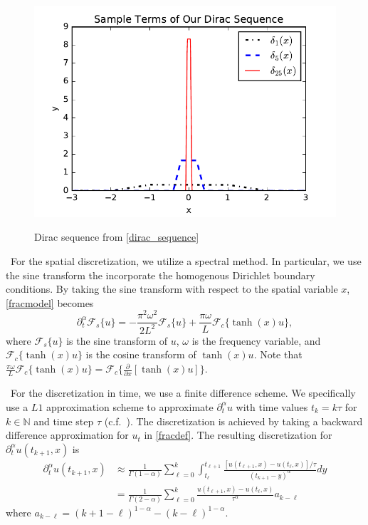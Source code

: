 \documentclass{siamart1116}
\newcommand{\LB}[1]{{\color{blue}~\textsf{#1}}}
\begin{document}
\begin{figure}[h!]
\begin{center}\label{dirac_sequence_fig}
\includegraphics[width=.5\textwidth]{delta_sequence}
\caption{Dirac sequence from \eqref{dirac_sequence}}
\end{center}
\end{figure}


\LB{For the spatial discretization, we utilize a spectral method. In particular, we use the sine transform the incorporate the homogenous Dirichlet boundary conditions. By taking the sine transform} with respect to the spatial variable $x$, \eqref{fracmodel} becomes
\begin{equation}
\partial^{\alpha}_{t}\mathcal{F}_s\{u\}=-\frac{\pi^2\omega^2}{2L^2}\mathcal{F}_s\{u\}+\frac{\pi\omega}{L}\mathcal{F}_c\{\tanh(x)u\},\label{sineq}
\end{equation}
where $\mathcal{F}_s\{u\}$ is the sine transform of $u$, $\omega$ is the frequency variable, and \LB{$\mathcal{F}_c\{\tanh(x)u\}$ is the cosine transform of $\tanh(x)u$. Note that $\frac{\pi\omega}{L}\mathcal{F}_c\{\tanh(x)u\} = \mathcal{F}_c\{\frac{\partial}{\partial x}[\tanh(x)u]\}.$}

\LB{For the discretization in time, we use a finite difference scheme.} We specifically use a $L1$ approximation scheme to approximate $\partial_{t}^{\alpha}u$ with time values $t_k=k\tau$ for $k\in\mathbb{N}$ and time step $\tau$ (c.f.\ \cite{lin}). The discretization is achieved by taking a backward difference approximation for $u_t$ in \eqref{fracdef}. The resulting discretization for $\partial_{t}^{\alpha}u(t_{k+1},x)$ is
\begin{align}
\partial_{t}^{\alpha}u(t_{k+1},x)&\approx\frac{1}{\Gamma(1-\alpha)}\sum_{\ell=0}^{k}\int_{t_{\ell}}^{t_{\ell+1}}\frac{[u(t_{\ell+1},x)-u(t_\ell,x)]/\tau}{(t_{k+1}-y)^{\alpha}}dy \nonumber\\
&=\frac{1}{\Gamma(2-\alpha)}\sum_{\ell=0}^{k}\frac{u(t_{\ell+1},x)-u(t_\ell,x)}{\tau^\alpha}a_{k-\ell}\label{discretization}
\end{align}
where $a_{k-\ell}=(k+1-\ell)^{1-\alpha}-(k-\ell)^{1-\alpha}$.
\end{document}
